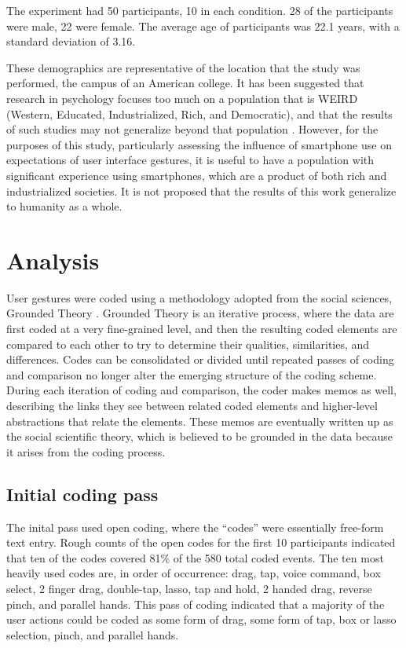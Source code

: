 The experiment had 50 participants, 10 in each condition. 28 of the participants were male, 22 were female. The average age of participants was 22.1 years, with a standard deviation of 3.16. 

These demographics are representative of the location that the study was performed, the campus of an American college. 
It has been suggested that research in psychology focuses too much on a population that is WEIRD (Western, Educated, Industrialized, Rich, and Democratic), and that the results of such studies may not generalize beyond that population \citep{arnett2008neglected}.
However, for the purposes of this study, particularly assessing the influence of smartphone use on expectations of user interface gestures, it is useful to have a population with significant experience using smartphones, which are a product of both rich and industrialized societies. 
It is not proposed that the results of this work generalize to humanity as a whole.  

\section{Analysis} \label{section:Analysis}

User gestures were coded using a methodology adopted from the social sciences, Grounded Theory \citep{glaser2017discovery}.
Grounded Theory is an iterative process, where the data are first coded at a very fine-grained level, and then the resulting coded elements are compared to each other to try to determine their qualities, similarities, and differences. 
Codes can be consolidated or divided until repeated passes of coding and comparison no longer alter the emerging structure of the coding scheme. 
During each iteration of coding and comparison, the coder makes memos as well, describing the links they see between related coded elements and higher-level abstractions that relate the elements. 
These memos are eventually written up as the social scientific theory, which is believed to be grounded in the data because it arises from the coding process. 

\subsection{Initial coding pass} \label{section:Initial_coding_pass}

The inital pass used open coding, where the ``codes'' were essentially free-form text entry. 
Rough counts of the open codes for the first 10 participants indicated that ten of the codes covered 81\% of the 580 total coded events. 
The ten most heavily used codes are, in order of occurrence: drag, tap, voice command, box select, 2 finger drag, double-tap, lasso, tap and hold, 2 handed drag, reverse pinch, and parallel hands. 
This pass of coding indicated that a majority of the user actions could be coded as some form of drag, some form of tap, box or lasso selection, pinch, and parallel hands. 

